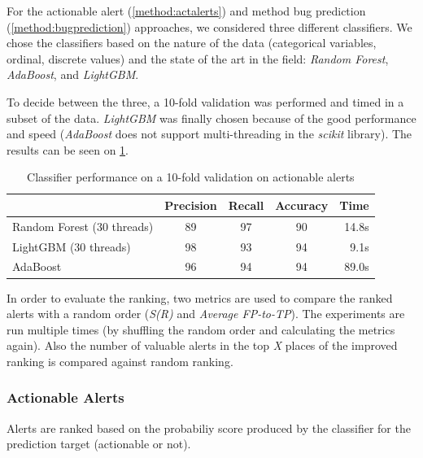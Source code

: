 For the actionable alert (\cref{method:actalerts}) and method bug prediction (\cref{method:bugprediction}) approaches, we considered three different classifiers. We chose the classifiers based on the nature of the data (categorical variables, ordinal, discrete values) and the state of the art in the field: \textit{Random Forest}, \textit{AdaBoost}, and \textit{LightGBM}.

To decide between the three, a 10-fold validation was performed and timed in a subset of the data. \textit{LightGBM} was finally chosen because of the good performance and speed (\textit{AdaBoost} does not support multi-threading in the \textit{scikit} library).
The results can be seen on \cref{choosing_classifier}.

\begin{longtable}[c]{@{}lcccr@{}}
	\caption{Classifier performance on a 10-fold validation on actionable alerts}
	\label{choosing_classifier}\\
	\toprule
	& Precision & Recall & Accuracy & Time  \\* \midrule
	\endfirsthead
	\endhead
	\bottomrule
	\endfoot
	\endlastfoot
	Random Forest (30 threads) & 89        & 97     & 90       & 14.8s \\
	LightGBM (30 threads)      & 98        & 93     & 94       & 9.1s  \\
	AdaBoost      & 96        & 94     & 94       & 89.0s   \\* \bottomrule
\end{longtable}


In order to evaluate the ranking, two metrics are used to compare the ranked alerts with a random order (\textit{S(R)} and \textit{Average FP-to-TP}). The experiments are run multiple times (by shuffling the random order and calculating the metrics again). Also the number of valuable alerts in the top \textit{X} places of the improved ranking is compared against random ranking. 


\subsubsection{Actionable Alerts}
\label{results:actionable_alerts}

Alerts are ranked based on the probabiliy score produced by the classifier for the prediction target (actionable or not). 

